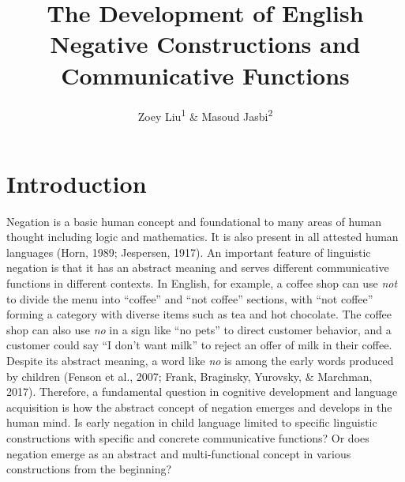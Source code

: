 \documentclass[
  man,floatsintext]{apa6}
\title{The Development of English Negative Constructions and Communicative Functions}
\author{Zoey Liu\textsuperscript{1} \& Masoud Jasbi\textsuperscript{2}}
\date{}
\affiliation{\vspace{0.5cm}\textsuperscript{1} University of Florida\\\textsuperscript{2} Uinversity of California, Davis}
\begin{document}
\maketitle

\section{Introduction}\label{introduction}

Negation is a basic human concept and foundational to many areas of human thought including logic and mathematics. It is also present in all attested human languages (Horn, 1989; Jespersen, 1917). An important feature of linguistic negation is that it has an abstract meaning and serves different communicative functions in different contexts. In English, for example, a coffee shop can use \emph{not} to divide the menu into ``coffee'' and ``not coffee'' sections, with ``not coffee'' forming a category with diverse items such as tea and hot chocolate. The coffee shop can also use \emph{no} in a sign like ``no pets'' to direct customer behavior, and a customer could say ``I don't want milk'' to reject an offer of milk in their coffee. Despite its abstract meaning, a word like \emph{no} is among the early words produced by children (Fenson et al., 2007; Frank, Braginsky, Yurovsky, \& Marchman, 2017). Therefore, a fundamental question in cognitive development and language acquisition is how the abstract concept of negation emerges and develops in the human mind. Is early negation in child language limited to specific linguistic constructions with specific and concrete communicative functions? Or does negation emerge as an abstract and multi-functional concept in various constructions from the beginning?
\end{document}

